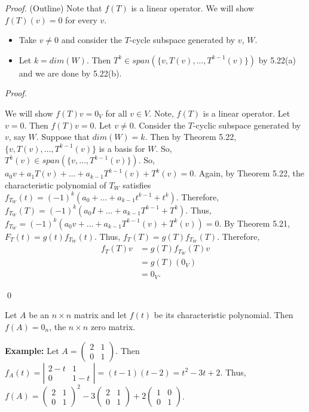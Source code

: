 \documentclass[12pt]{article}
\newenvironment{corollary}[2][Corollary]{\begin{trivlist}
\item[\hskip \labelsep {\bfseries #1}\hskip \labelsep {\bfseries #2}]}{\end{trivlist}}
\newenvironment{sol}
    {\emph{Proof.}
    }
    {
    \qed
    }
\begin{document}
\textit{Proof.} (Outline)
Note that $f(T)$ is a linear operator. We will show $f(T)(v) = 0$ for every $v$.

\begin{itemize}
    \item Take $v \neq 0$ and consider the $T$-cycle subspace generated by $v$, $W$.
    
    \item Let $k = dim(W)$. Then $T^k \in span(\{v, T(v), \dots, T^{k-1}(v)\})$ by 5.22(a) and we are done by 5.22(b).
\end{itemize}

\begin{sol}
We will show $f(T)v = 0_V$ for all $v \in V$. Note, $f(T)$ is a linear operator. Let $v = 0$. Then $f(T)v = 0$. Let $v \neq 0$. Consider the $T$-cyclic subspace generated by $v$, say $W$. Suppose that $dim(W) = k$. Then by Theorem 5.22, $\{v, T(v), \dots, T^{k-1}(v)\}$ is a basis for $W$. So, $T^k(v) \in span(\{v, \dots, T^{k-1}(v)\})$. So, $a_0v + a_1T(v) + \dots + a_{k-1}T^{k-1}(v) + T^k(v) = 0$. Again, by Theorem 5.22, the characteristic polynomial of $T_W$ satisfies $f_{T_W}(t) = (-1)^k(a_0 + \dots + a_{k-1}t^{k-1} + t^k)$. Therefore, $f_{T_W}(T) = (-1)^k(a_0I + \dots + a_{k-1}T^{k-1} + T^k)$. Thus, $f_{T_W} = (-1)^k(a_0v + \dots + a_{k-1}T^{k-1}(v) + T^k(v)) = 0$. By Theorem 5.21, $F_T(t) = g(t)f_{T_W}(t)$. Thus, $f_T(T) = g(T)f_{T_W}(T)$. Therefore, \begin{align*}
    f_T(T)v &= g(T)f_{T_W}(T)v \\ &= g(T)(0_V) \\ &= 0_V.
\end{align*}
\end{sol}

\begin{corollary}{15}
Let $A$ be an $n \times n$ matrix and let $f(t)$ be its characteristic polynomial. Then $f(A) = 0_n$, the $n \times n$ zero matrix.
\end{corollary}

\noindent\textbf{Example:} Let $A = \begin{pmatrix}
2 & 1 \\ 0 & 1
\end{pmatrix}$. Then $f_A(t) = \left| \begin{array}{cc}
    2-t & 1 \\
    0 & 1-t
\end{array} \right| = (t-1)(t-2) = t^2 - 3t + 2$. Thus, $f(A) = \begin{pmatrix}
2 & 1 \\ 0 & 1
\end{pmatrix}^2 - 3 \begin{pmatrix}
2 & 1 \\ 0 & 1
\end{pmatrix} + 2 \begin{pmatrix}
1 & 0 \\ 0 & 1
\end{pmatrix}$.
\end{document}
